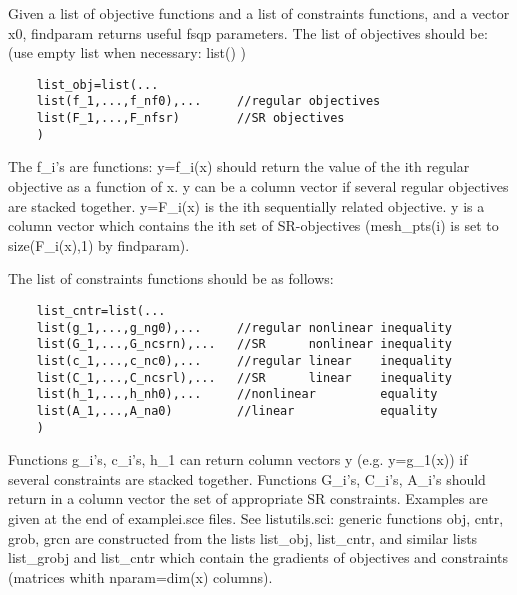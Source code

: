 \begin{mandescription}
  
  Given a list of objective functions and a list of constraints
  functions, and a vector x0, findparam returns useful fsqp
  parameters.
  The list of objectives should be: (use empty list when necessary: list() )
  
  \begin{Verbatim}
    list_obj=list(...
    list(f_1,...,f_nf0),...     //regular objectives
    list(F_1,...,F_nfsr)        //SR objectives
    )
  \end{Verbatim}

  The f\_i's are functions: y=f\_i(x) should return the value of the ith
  regular objective as a function of x. y can be a column vector if
  several regular objectives are stacked together.
  y=F\_i(x) is the ith sequentially related objective. y is a column
  vector which contains the ith set of SR-objectives (mesh\_pts(i) is
  set to size(F\_i(x),1) by findparam).
  
  The list of constraints functions should be as follows:
  
  \begin{Verbatim}
    list_cntr=list(...
    list(g_1,...,g_ng0),...     //regular nonlinear inequality
    list(G_1,...,G_ncsrn),...   //SR      nonlinear inequality
    list(c_1,...,c_nc0),...     //regular linear    inequality
    list(C_1,...,C_ncsrl),...   //SR      linear    inequality
    list(h_1,...,h_nh0),...     //nonlinear         equality
    list(A_1,...,A_na0)         //linear            equality
    )
  \end{Verbatim}

  Functions g\_i's, c\_i's, h\_1 can return column vectors y (e.g. y=g\_1(x)) 
  if several constraints are stacked together.
  Functions G\_i's, C\_i's, A\_i's should return in a column vector the
  set of appropriate SR constraints.
  Examples are given at the end of examplei.sce files. See
  listutils.sci: generic functions obj, cntr, grob, grcn are constructed
  from the lists list\_obj, list\_cntr, and similar lists list\_grobj
  and list\_cntr which contain the gradients of objectives and constraints
  (matrices whith nparam=dim(x) columns).
  
\end{mandescription}

\begin{manseealso}
     
\end{manseealso}

